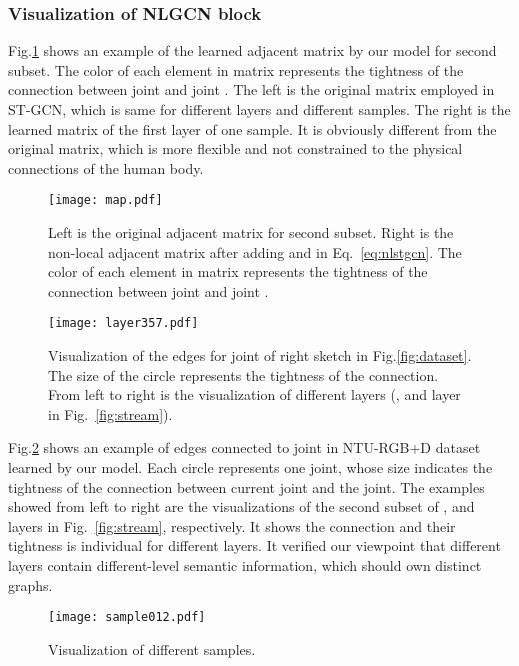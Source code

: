 \documentclass[10pt,twocolumn,letterpaper]{article}
\begin{document}
    \subsubsection{Visualization of NLGCN block}
    Fig.\ref{fig:map} shows an example of the learned adjacent matrix by our model for second subset.
	The color of each element  in matrix represents the tightness of the connection between joint  and joint . The left is the original matrix employed in ST-GCN, which is same for different layers and different samples. The right is the learned matrix of the first layer of one sample. It is obviously different from the original matrix, which is more flexible and not constrained to the physical connections of the human body.
    \begin{figure}[!htb]
	\begin{center}
	\texttt{[image: map.pdf]}
	\caption{Left is the original adjacent matrix for second subset. Right is the non-local adjacent matrix after adding  and  in Eq.~\ref{eq:nlstgcn}. The color of each element  in matrix represents the tightness of the connection between joint  and joint .}
	\label{fig:map}	
	\end{center}
	\end{figure}

    \begin{figure}[!htb]
	\begin{center}
	\texttt{[image: layer357.pdf]}
	\caption{Visualization of the edges for  joint of right sketch in Fig.\ref{fig:dataset}. The size of the circle represents the tightness of the connection. From left to right is the visualization of different layers (,  and  layer in Fig.~\ref{fig:stream}).}
	\label{fig:layer357}	
	\end{center}
	\end{figure}

	Fig.\ref{fig:layer357} shows an example of edges connected to  joint in NTU-RGB+D dataset learned by our model. Each circle represents one joint, whose size indicates the tightness of the connection between current joint and the  joint. The examples showed from left to right are the visualizations of the second subset of ,  and  layers in Fig.~\ref{fig:stream}, respectively. It shows the connection and their tightness is individual for different layers. It verified our viewpoint that different layers contain different-level semantic information, which should own distinct graphs.
    
	\begin{figure}[!htb]
	\begin{center}
	\texttt{[image: sample012.pdf]}
	\caption{Visualization of different samples.}
	\label{fig:sample012}
	\end{center}
	\end{figure}
    
\end{document}
